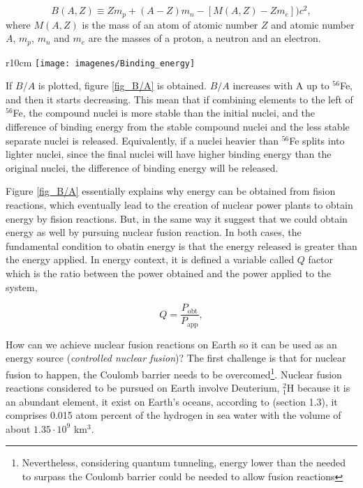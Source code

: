 \documentclass[a4paper,12pt,oneside]{book}
\begin{document}
\begin{equation}
B(A,Z) \equiv Zm_p+(A-Z)m_n-[M(A,Z)-Zm_e])c^2,
\end{equation} 
where $M(A,Z)$ is the mass of an atom of atomic number $Z$ and atomic number $A$, $m_p$, $m_n$ and $m_e$ are the masses of a proton, a neutron and an electron. 
\begin{wrapfigure}{r}{10cm}
\centering
\texttt{[image: imagenes/Binding\_energy]}
\caption{Binding enery per nucleon [KRANE]. The maximum $B/A$ correspond to $^{56}$Fe, the most stable element.}
\label{fig_B/A}
\end{wrapfigure} 
If $B/A$ is plotted, figure \ref{fig_B/A}  is obtained. $B/A$ increases with A up to $^{56}$Fe, and then it starts decreasing. This mean that if combining elements to the left of $^{56}$Fe, the compound nuclei is more stable than the initial nuclei, and the difference of binding energy from the stable compound nuclei and the less stable separate nuclei is released. Equivalently, if a nuclei heavier than $^{56}$Fe splits into lighter nuclei, since the final nuclei will have higher binding energy than the original nuclei, the difference of binding energy will be released.

Figure \ref{fig_B/A} essentially explains why energy can be obtained from fision reactions, which eventually lead to the creation of nuclear power plants to obtain energy by fision reactions. But, in the same way it suggest that we could obtain energy as well by pursuing nuclear fusion reaction. In both cases, the fundamental condition to obatin energy is that the energy released is greater than the energy applied. In energy context, it is defined a variable called $Q$ factor which is the ratio between the power obtained and the power applied to the system,

\begin{equation}
Q=\dfrac{P_\text{obt}}{P_\text{app}},
\end{equation} 
%

How can we achieve nuclear fusion reactions on Earth so it can be used as an energy source (\textit{controlled nuclear fusion})? The first challenge is that for nuclear fusion to happen, the Coulomb barrier needs to be overcomed\footnote{Nevertheless, considering quantum tunneling, energy lower than the needed to surpass the Coulomb barrier could be needed to allow fusion reactions}. Nuclear fusion reactions considered to be pursued on Earth involve Deuterium, ${}_1^2 \text{H}$ because it is an abundant element, it exist on Earth's oceans, according to \cite{Miyamoto} (section 1.3), it comprises 0.015 atom percent of the hydrogen in sea water with the volume of about $1.35 \cdot 10^9$ km$^3$.
\end{document}
